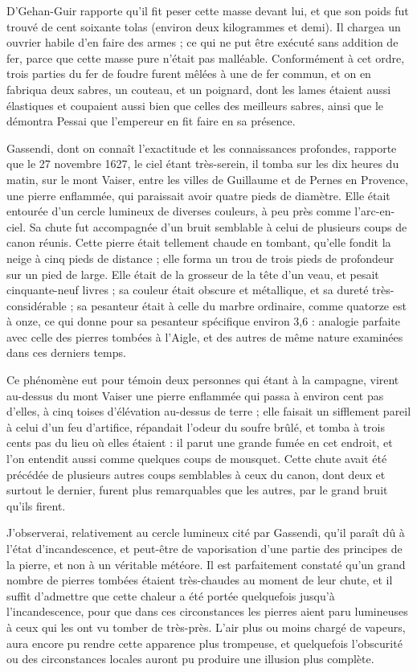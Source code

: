 \documentclass[a4paper, 12pt, oneside, french]{article}
\begin{document}
D'Gehan-Guir rapporte qu'il fit peser cette masse devant lui, et que son poids fut trouvé de cent soixante tolas (environ deux kilogrammes et demi). Il chargea un ouvrier habile d'en faire des armes ; ce qui ne put être exécuté sans addition de fer, parce que cette masse pure n'était pas malléable. Conformément à cet ordre, trois parties du fer de foudre furent mêlées à une de fer commun, et on en fabriqua deux sabres, un couteau, et un poignard, dont les lames étaient aussi élastiques et coupaient aussi bien que celles des meilleurs sabres, ainsi que le démontra Pessai que l'empereur en fit faire en sa présence.

Gassendi, dont on connaît l'exactitude et les connaissances profondes, rapporte que le 27 novembre 1627, le ciel étant très-serein, il tomba sur les dix heures du matin, sur le mont Vaiser, entre les villes de Guillaume et de Pernes en Provence, une pierre enflammée, qui paraissait avoir quatre pieds de diamètre. Elle était entourée d'un cercle lumineux de diverses couleurs, à peu près comme l'arc-en-ciel. Sa chute fut accompagnée d'un bruit semblable à celui de plusieurs coups de canon réunis. Cette pierre était tellement chaude en tombant, qu'elle fondit la neige à cinq pieds de distance ; elle forma un trou de trois pieds de profondeur sur un pied de large. Elle était de la grosseur de la tête d'un veau, et pesait cinquante-neuf livres ; sa couleur était obscure et métallique, et sa dureté très-considérable ; sa pesanteur était à celle du marbre ordinaire, comme quatorze est à onze, ce qui donne pour sa pesanteur spécifique environ 3,6 : analogie parfaite avec celle des pierres tombées à l'Aigle, et des autres de même nature examinées dans ces derniers temps.

Ce phénomène eut pour témoin deux personnes qui étant à la campagne, virent au-dessus du mont Vaiser une pierre enflammée qui passa à environ cent pas d'elles, à cinq toises d'élévation au-dessus de terre ; elle faisait un sifflement pareil à celui d'un feu d'artifice, répandait l'odeur du soufre brûlé, et tomba à trois cents pas du lieu où elles étaient : il parut une grande fumée en cet endroit, et l'on entendit aussi comme quelques coups de mousquet. Cette chute avait été précédée de plusieurs autres coups semblables à ceux du canon, dont deux et surtout le dernier, furent plus remarquables que les autres, par le grand bruit qu'ils firent.

J'observerai, relativement au cercle lumineux cité par Gassendi, qu'il paraît dû à l'état d'incandescence, et peut-être de vaporisation d'une partie des principes de la pierre, et non à un véritable météore. Il est parfaitement constaté qu'un grand nombre de pierres tombées étaient très-chaudes au moment de leur chute, et il suffit d'admettre que cette chaleur a été portée quelquefois jusqu'à l'incandescence, pour que dans ces circonstances les pierres aient paru lumineuses à ceux qui les ont vu tomber de très-près. L'air plus ou moins chargé de vapeurs, aura encore pu rendre cette apparence plus trompeuse, et quelquefois l'obscurité ou des circonstances locales auront pu produire une illusion plus complète.
\end{document}
